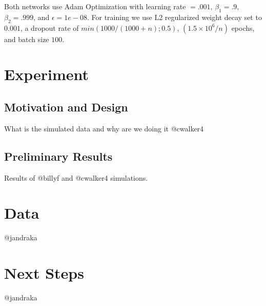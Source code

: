 \documentclass[11pt, oneside]{article}   	%
\begin{document}
Both networks use Adam Optimization with learning rate $=.001$, $\beta_1 = .9$, $\beta_2 = .999$, and $\epsilon = 1e-08$. For training we use L2 regularized weight decay set to $0.001$, a dropout rate of $min(1000/(1000+n); 0.5)$, $(1.5 \times 10^6/n)$ epochs, and batch size $100$. 


\section{Experiment}
\subsection{Motivation and Design}
What is the simulated data and why are we doing it @cwalker4

\subsection{Preliminary Results} 
Results of @billyf and @cwalker4 simulations.

\section{Data}
@jandraka

\section{Next Steps}
@jandraka 
\end{document}

